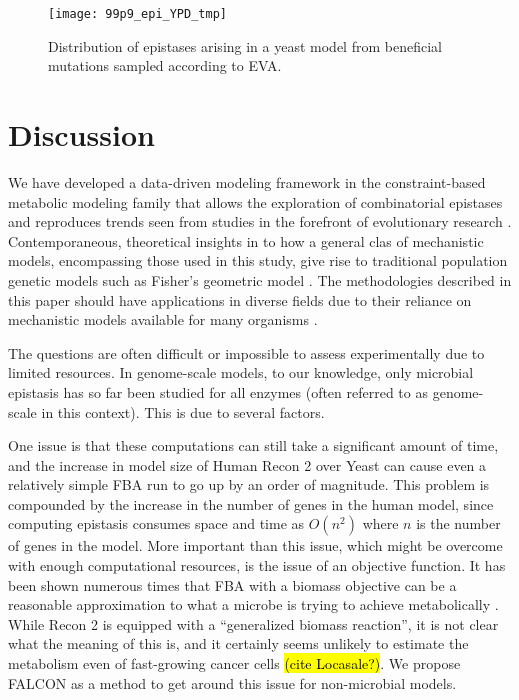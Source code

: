 \begin{figure}
\centering
  \texttt{[image: 99p9\_epi\_YPD\_tmp]}
  \caption{Distribution of epistases arising in a yeast model from
beneficial mutations sampled according to EVA.}
  \label{fig:epiBeneDist}
\end{figure}

\section{Discussion}

We have developed a data-driven modeling framework in the
constraint-based metabolic modeling family that allows the exploration
of combinatorial epistases and reproduces trends seen from studies in
the forefront of evolutionary research \citep{Martin2007a, Chou2011,
Khan2011}. Contemporaneous, theoretical insights in to how a general
clas of mechanistic models, encompassing those used in this study,
give rise to traditional population genetic models such as Fisher's
geometric model \citep{Martin2014}.  The methodologies described in
this paper should have applications in diverse fields due to their
reliance on mechanistic models available for many organisms
\citep{Monk}.

The questions are often
difficult or impossible to assess experimentally due to limited
resources.  In genome-scale models, to our knowledge, only microbial
epistasis has so far been studied for all enzymes (often referred to
as genome-scale in this context). This is due to several factors.

One issue is that these computations can still take a significant
amount of time, and the increase in model size of Human Recon 2 over
Yeast can cause even a relatively simple FBA run to go up by an order
of magnitude.  This problem is compounded by the increase in the
number of genes in the human model, since computing epistasis consumes
space and time as $O(n^2)$ where $n$ is the number of genes in the
model. More important than this issue, which might be overcome with
enough computational resources, is the issue of an objective
function. It has been shown numerous times that FBA with a biomass
objective can be a reasonable approximation to what a microbe is
trying to achieve metabolically
\citep{Schuetz2012, Fong2004, Varma1994}. While Recon 2
is equipped with a ``generalized biomass reaction'', it is not clear
what the meaning of this is, and it certainly seems unlikely to
estimate the metabolism even of fast-growing cancer cells \hl{(cite
  Locasale?)}. We propose FALCON as a method to get around this issue
for non-microbial models.

